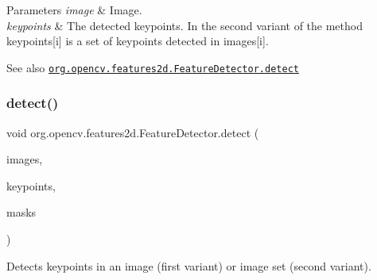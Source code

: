 \begin{DoxyParams}{Parameters}
{\em image} & Image. \\
\hline
{\em keypoints} & The detected keypoints. In the second variant of the method {\ttfamily keypoints\mbox{[}i\mbox{]}} is a set of keypoints detected in {\ttfamily images\mbox{[}i\mbox{]}}.\\
\hline
\end{DoxyParams}
\begin{DoxySeeAlso}{See also}
\href{http://docs.opencv.org/modules/features2d/doc/common_interfaces_of_feature_detectors.html#featuredetector-detect}{\tt org.\+opencv.\+features2d.\+Feature\+Detector.\+detect} 
\end{DoxySeeAlso}
\mbox{\label{classorg_1_1opencv_1_1features2d_1_1_feature_detector_a2d08427ba77652f525490016e7ee5419}} 
\subsubsection{\texorpdfstring{detect()}{detect()}\hspace{0.1cm}{\footnotesize\ttfamily [3/4]}}
{\footnotesize\ttfamily void org.\+opencv.\+features2d.\+Feature\+Detector.\+detect (\begin{DoxyParamCaption}\item[{List$<$ \mbox{\hyperlink{classorg_1_1opencv_1_1core_1_1_mat}{Mat}} $>$}]{images,  }\item[{List$<$ \mbox{\hyperlink{classorg_1_1opencv_1_1core_1_1_mat_of_key_point}{Mat\+Of\+Key\+Point}} $>$}]{keypoints,  }\item[{List$<$ \mbox{\hyperlink{classorg_1_1opencv_1_1core_1_1_mat}{Mat}} $>$}]{masks }\end{DoxyParamCaption})}

Detects keypoints in an image (first variant) or image set (second variant).



